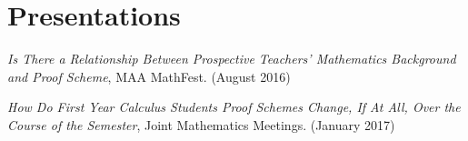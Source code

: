 \section{\sc Presentations}



\emph{Is There a Relationship Between Prospective Teachers' Mathematics Background and Proof Scheme}, MAA MathFest.  (August 2016)

\emph{How Do First Year Calculus Students Proof Schemes Change, If At All, Over the Course of the Semester}, Joint Mathematics Meetings. (January 2017)

\endinput